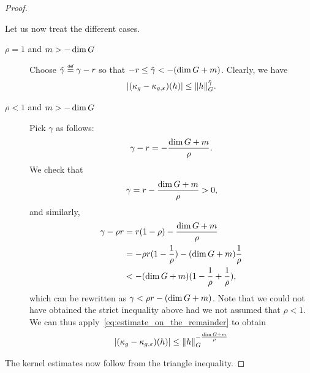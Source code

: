 \begin{proof}
\begin{description}
            Let us now treat the different cases.
            \begin{description}
                \item[$\rho = 1$ and $m > -\dim \Group$]
                    Choose $\tilde \gamma \defeq \gamma - r$
                    so that $-r \leq \tilde \gamma < -(\dim \Group + m)$.
                    Clearly, we have
                    \begin{align*}
                        \abs{(\kappa_g - \kappa_{g, \epsilon})(h)}
                        \leq \norm [\Group] h^{\tilde \gamma}.
                    \end{align*}
                \item[$\rho < 1$ and $m > -\dim \Group$]
                    Pick $\gamma$ as follows:
                    \begin{align*}
                        \gamma - r = -\frac{\dim \Group + m} \rho.
                    \end{align*}
                    We check that
                    \begin{align*}
                        \gamma = r - \frac {\dim \Group + m} \rho > 0,
                    \end{align*}
                    and similarly,
                    \begin{align*}
                        \gamma - \rho r &= r(1 - \rho) - \frac {\dim \Group + m} \rho\\
                        &= -\rho r(1 - \frac 1 \rho) - (\dim \Group + m) \frac 1 \rho\\
                        &< -(\dim \Group + m)(1 - \frac 1 \rho + \frac 1 \rho),
                    \end{align*}
                    which can be rewritten as $\gamma < \rho r - (\dim \Group + m)$.
                    Note that we could not have obtained the strict inequality above
                    had we not assumed that $\rho < 1$.
                    We can thus apply~\eqref{eq:estimate_on_the_remainder} to obtain
                    \begin{align*}
                        \abs{(\kappa_g - \kappa_{g, \epsilon})(h)}
                        \leq \norm [\Group] h^{-\frac {\dim \Group + m} \rho}
                    \end{align*}
            \end{description}
    \end{description}
    The kernel estimates now follow from the triangle inequality.
\end{proof}

